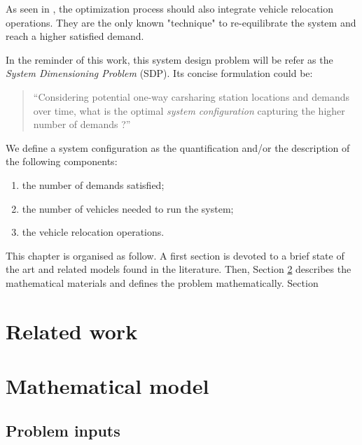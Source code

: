 \begin{bibunit}[ieeetr]
As seen in \cite{les_relocs_sont_importantes_et_necessaires}, the optimization process should also integrate vehicle relocation operations.
They are the only known "technique" to re-equilibrate the system and reach a higher satisfied demand.

In the reminder of this work, this system design problem will be refer as the \emph{System Dimensioning Problem} (SDP).
Its concise formulation could be:
\begin{quote}
``Considering potential one-way carsharing station locations and demands over time, what is the optimal \emph{system configuration} capturing the higher number of demands ?''
\end{quote}

We define a system configuration as the quantification and/or the description of the following components:
\begin{enumerate}
\item the number of demands satisfied;
\item the number of vehicles needed to run the system;
\item the vehicle relocation operations.
\end{enumerate}

This chapter is organised as follow.
A first section is devoted to a brief state of the art and related models found in the literature.
Then, Section \ref{sec:mathModel} describes the mathematical materials and defines the problem mathematically.
Section 


\newpage
\section{Related work}


\newpage
\section{Mathematical model} \label{sec:mathModel}
\subsection{Problem inputs}


\end{bibunit}
